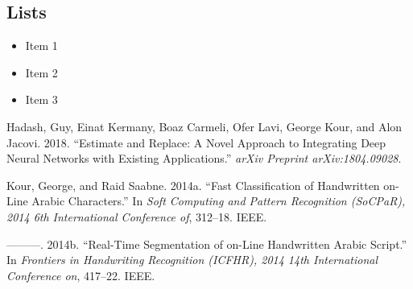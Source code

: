 \documentclass{article}
\providecommand{\tightlist}{%
  \setlength{\itemsep}{0pt}\setlength{\parskip}{0pt}}
\newlength{\cslhangindent}
\newlength{\cslentryspacingunit} %
\newenvironment{CSLReferences}[2] %
 {%
  \setlength{\parindent}{0pt}
  \ifodd #1
  \let\oldpar\par
  \def\par{\hangindent=\cslhangindent\oldpar}
  \fi
  \setlength{\parskip}{#2\cslentryspacingunit}
 }%
 {}
\begin{document}
\hypertarget{lists}{%
\subsection{Lists}\label{lists}}

\begin{itemize}
\tightlist
\item
  Item 1
\item
  Item 2
\item
  Item 3
\end{itemize}

\hypertarget{refs}{}
\begin{CSLReferences}{1}{0}
\leavevmode{}%
Hadash, Guy, Einat Kermany, Boaz Carmeli, Ofer Lavi, George Kour, and
Alon Jacovi. 2018. {``Estimate and Replace: A Novel Approach to
Integrating Deep Neural Networks with Existing Applications.''}
\emph{arXiv Preprint arXiv:1804.09028}.

\leavevmode{}%
Kour, George, and Raid Saabne. 2014a. {``Fast Classification of
Handwritten on-Line Arabic Characters.''} In \emph{Soft Computing and
Pattern Recognition (SoCPaR), 2014 6th International Conference of},
312--18. IEEE.

\leavevmode{}%
---------. 2014b. {``Real-Time Segmentation of on-Line Handwritten
Arabic Script.''} In \emph{Frontiers in Handwriting Recognition (ICFHR),
2014 14th International Conference on}, 417--22. IEEE.

\end{CSLReferences}



\end{document}

